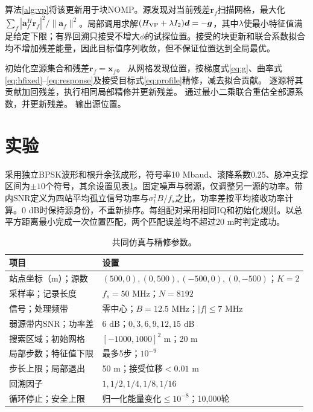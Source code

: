 \documentclass[a4paper,12pt,review]{cas-sc}
\begin{document}
算法\ref{alg:vp}将该更新用于块NOMP。源发现对当前残差$\bm r_f$扫描网格，最大化$\sum_f|\bm a_f^H\bm r_f|^2/\|\bm a_f\|^2$。局部调用求解$(H_{\rm VP}+\lambda I_2)\bm d=-\bm g$，其中$\lambda$使最小特征值满足给定下限；有界回溯只接受不增大$\phi$的试探位置。接受的块更新和联合系数拟合均不增加残差能量，因此目标值序列收敛，但不保证位置达到全局最优。
\begin{algorithm}[htbp]
\caption{已知源数$K$的VP-BNOMP}\label{alg:vp}
\begin{algorithmic}[1]
\State 初始化空源集合和残差$\bm r_f=\bm x_f$。
\State 从网格发现位置，按梯度式\eqref{eq:g}、曲率式\eqref{eq:hfixed}--\eqref{eq:response}及接受目标式\eqref{eq:profile}精修，减去拟合贡献。
\Repeat
\State 逐源将其贡献加回残差，执行相同局部精修并更新残差。
\State 通过最小二乘联合重估全部源系数，并更新残差。
\EndFor
\State 输出源位置。
\end{algorithmic}
\end{algorithm}

\FloatBarrier
\section{实验}
采用独立BPSK波形和根升余弦成形，符号率10 Mbaud、滚降系数0.25、脉冲支撑区间为$\pm10$个符号，其余设置见表\ref{tab:settings}。固定噪声与弱源，仅调整另一源的功率。带内SNR定义为四站平均孤立信号功率与$\sigma_t^2B/f_s$之比，功率差按平均接收功率计算。0 dB时保持源身份，不重新排序。每组配对采用相同IQ和初始化规则。以总平方距离最小完成一次位置匹配，两个匹配误差均不超过20 m时判定成功。
\begin{table}[pos=H]
\caption{共同仿真与精修参数。}\label{tab:settings}
\centering
\begin{tabular}{ll}
\toprule
项目 & 设置 \\
\midrule
站点坐标（m）；源数 & $(500,0),(0,500),(-500,0),(0,-500)$；$K=2$ \\
采样率；记录长度 & $f_s=50$ MHz；$N=8192$ \\
信号；处理频带 & 零中心；$B=12.5$ MHz；$|f|\le7$ MHz \\
弱源带内SNR；功率差 & 6 dB；$0,3,6,9,12,15$ dB \\
搜索区域；初始网格 & $[-1000,1000]^2$ m；20 m \\
局部步数；特征值下限 & 最多5步；$10^{-9}$ \\
步长上限；局部退出 & 50 m；接受位移$<0.01$ m \\
回溯因子 & $1,1/2,1/4,1/8,1/16$ \\
循环停止；安全上限 & 归一化能量变化$\le10^{-8}$；10,000轮 \\
\bottomrule
\end{tabular}
\end{table}
\end{document}

